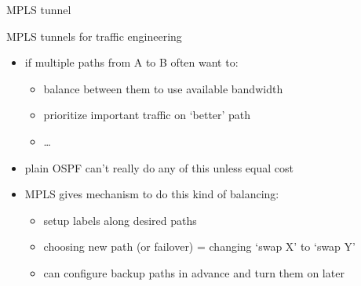 \begin{frame}[fragile]{MPLS tunnel}
\end{frame}

\begin{frame}{MPLS tunnels for traffic engineering}
    \begin{itemize}
    \item if multiple paths from A to B often want to:
        \begin{itemize}
        \item balance between them to use available bandwidth
        \item prioritize important traffic on `better' path
        \item \ldots
        \end{itemize}
    \item plain OSPF can't really do any of this unless equal cost
    \vspace{.5cm}
    \item MPLS gives mechanism to do this kind of balancing:
        \begin{itemize}
        \item setup labels along desired paths
        \item choosing new path (or failover) = changing `swap X' to `swap Y'
        \item can configure backup paths in advance and turn them on later
        \end{itemize}
    \end{itemize}
\end{frame}

